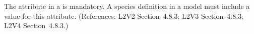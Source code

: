 The  attribute in a \Species is mandatory.  A species
definition in a model must include a value for this attribute.  (References:
L2V2 Section~4.8.3; L2V3 Section~4.8.3; L2V4 Section~4.8.3.)

